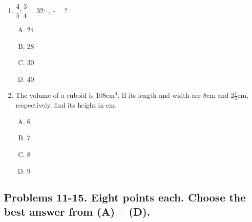 \documentclass[12pt]{scrartcl}
\begin{document}
\begin{enumerate}
\item $\dfrac{4}{5} : \dfrac{3}{4} = 32 : \square$, $\square = ?$
    \begin{multicols}{4}
        \begin{enumerate}[(A)]
            \item 24
            \item 28
            \item 30
            \item 40
        \end{enumerate}
    \end{multicols} \hrulefill

\newpage
\item The volume of a cuboid is 108cm$^3$. If its length and width are 8cm and $2\frac{1}{4}$cm, respectively, find its height in cm.
    \begin{multicols}{4}
        \begin{enumerate}[(A)]
            \item 6
            \item 7
            \item 8
            \item 9
        \end{enumerate}
    \end{multicols} \hrulefill
\end{enumerate}

\subsection*{Problems 11-15. Eight points each. Choose the best answer from (A) -- (D).}
\hrulefill
\end{document}
